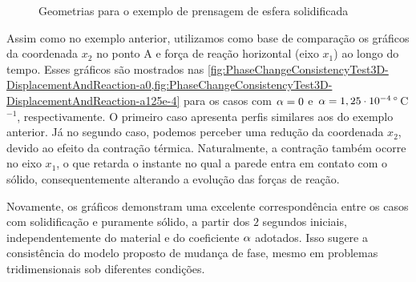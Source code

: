 \documentclass[Tese.tex]{subfiles}
\begin{document}
\begin{figure}[!htb]
	\centering
	\caption{Geometrias para o exemplo de prensagem de esfera solidificada}
	\label{fig:PhaseChangeConsistencyTest3D}
	{\small
		\noindent{}
	}	
\end{figure}

Assim como no exemplo anterior, utilizamos como base de comparação os gráficos da coordenada $x_2$ no ponto A e força de reação horizontal (eixo $x_1$) ao longo do tempo. Esses gráficos são mostrados nas \cref{fig:PhaseChangeConsistencyTest3D-DisplacementAndReaction-a0,fig:PhaseChangeConsistencyTest3D-DisplacementAndReaction-a125e-4} para os casos com $\alpha = 0$ e $\alpha = 1,25\cdot 10^{-4}\,^{\circ}$C$^{-1}$, respectivamente. O primeiro caso apresenta perfis similares aos do exemplo anterior. Já no segundo caso, podemos perceber uma redução da coordenada $x_2$, devido ao efeito da contração térmica. Naturalmente, a contração também ocorre no eixo $x_1$, o que retarda o instante no qual a parede entra em contato com o sólido, consequentemente alterando a evolução das forças de reação.

Novamente, os gráficos demonstram uma excelente correspondência entre os casos com solidificação e puramente sólido, a partir dos $2$ segundos iniciais, independentemente do material e do coeficiente $\alpha$ adotados. Isso sugere a consistência do modelo proposto de mudança de fase, mesmo em problemas tridimensionais sob diferentes condições.
\end{document}
